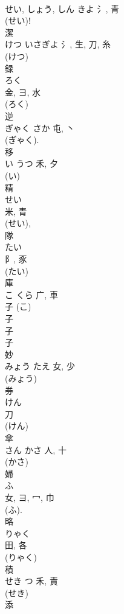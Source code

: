 \documentclass[8pt]{extreport}
\begin{document}
\begin{CJK}{UTF8}{min}
\\	せい, しょう, しん	きよ	氵, 青	
\\	(せい)! 
\\	潔	
\\	けつ	いさぎよ	氵, 生, 刀, 糸	
\\	(けつ) 
\\	録	
\\	ろく	
\\	金, ヨ, 水	
\\	(ろく) 
\\	逆	
\\	ぎゃく	さか	屯, 丶		
\\	(ぎゃく). 
\\	移	
\\	い	うつ	禾, 夕	
\\	(い) 
\\	精	
\\	せい	
\\	米, 青	
\\	(せい), 
\\	隊	
\\	たい	
\\	阝, 豕		
\\	(たい) 
\\	庫	
\\	こ	くら	广, 車	
\\	子 (こ) 
\\	子
\\	子 
\\	子 
\\	妙	
\\	みょう	たえ	女, 少	
\\	(みょう) 
\\	券	
\\	けん	
\\	刀		
\\	(けん) 
\\	傘	
\\	さん	かさ	人, 十		
\\	(かさ) 
\\	婦	
\\	ふ	
\\	女, ヨ, 冖, 巾	
\\	(ふ). 
\\	略	
\\	りゃく	
\\	田, 各	
\\	(りゃく) 
\\	積	
\\	せき	つ	禾, 責	
\\	(せき) 
\\	添	

\end{CJK}
\end{document}
